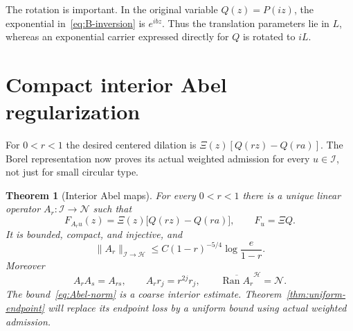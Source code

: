 \documentclass[11pt,a4paper]{article}
\numberwithin{equation}{section}
\newtheorem{theorem}{Theorem}[section]
\theoremstyle{definition}
\theoremstyle{remark}
\newcommand{\Hh}{\mathcal H}
\newcommand{\Nn}{\mathcal N}
\newcommand{\Ii}{\mathcal I}
\newcommand{\norm}[1]{\lVert #1\rVert}
\newcommand{\Ran}{\operatorname{Ran}}
\begin{document}
The rotation is important. In the original variable $Q(z)=P(iz)$, the exponential in~\eqref{eq:B-inversion} is $e^{ibz}$. Thus the translation parameters lie in $L$, whereas an exponential carrier expressed directly for $Q$ is rotated to $iL$.

\section{Compact interior Abel regularization}\label{sec:Abel-maps}

For $0<r<1$ the desired centered dilation is
$\Xi(z)[Q(rz)-Q(ra)]$. The Borel representation now proves its actual weighted admission for every $u\in\Ii$, not just for small circular type.

\begin{theorem}[Interior Abel maps]\label{thm:Abel-maps}
For every $0<r<1$ there is a unique linear operator $A_r:\Ii\to\Nn$ such that
\begin{equation}\label{eq:Abel-transform}
 F_{A_ru}(z)=\Xi(z)\bigl[Q(rz)-Q(ra)\bigr],
 \qquad F_u=\Xi Q.
\end{equation}
It is bounded, compact, and injective, and
\begin{equation}\label{eq:Abel-norm}
 \norm{A_r}_{\Ii\to\Hh}
 \le C(1-r)^{-5/4}\log\frac e{1-r}.
\end{equation}
Moreover
\begin{equation}\label{eq:Abel-semigroup}
 A_rA_s=A_{rs},\qquad A_rr_j=r^{2j}r_j,\qquad
 \overline{\Ran A_r}^{\Hh}=\Nn.
\end{equation}
The bound~\eqref{eq:Abel-norm} is a coarse interior estimate. Theorem~\ref{thm:uniform-endpoint} will replace its endpoint loss by a uniform bound using actual weighted admission.
\end{theorem}
\end{document}
